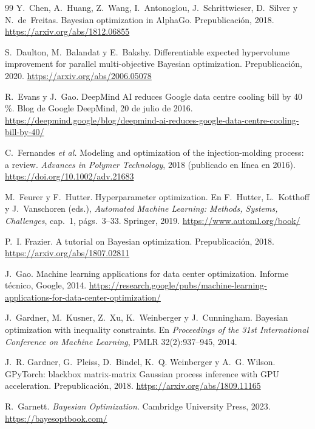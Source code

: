 \begin{thebibliography}{99}
Y.~Chen, A.~Huang, Z.~Wang, I.~Antonoglou, J.~Schrittwieser, D.~Silver y N.~de~Freitas.
\newblock Bayesian optimization in AlphaGo.
\newblock Prepublicación, 2018.
\newblock \url{https://arxiv.org/abs/1812.06855}

S.~Daulton, M.~Balandat y E.~Bakshy.
\newblock Differentiable expected hypervolume improvement for parallel multi-objective Bayesian optimization.
\newblock Prepublicación, 2020.
\newblock \url{https://arxiv.org/abs/2006.05078}

R.~Evans y J.~Gao.
\newblock DeepMind AI reduces Google data centre cooling bill by 40\,\%.
\newblock Blog de Google DeepMind, 20 de julio de 2016.
\newblock \url{https://deepmind.google/blog/deepmind-ai-reduces-google-data-centre-cooling-bill-by-40/}

C.~Fernandes \emph{et al.}
\newblock Modeling and optimization of the injection-molding process: a review.
\newblock \emph{Advances in Polymer Technology}, 2018 (publicado en línea en 2016).
\newblock \url{https://doi.org/10.1002/adv.21683}

M.~Feurer y F.~Hutter.
\newblock Hyperparameter optimization.
\newblock En F.~Hutter, L.~Kotthoff y J.~Vanschoren (eds.), \emph{Automated Machine Learning: Methods, Systems, Challenges}, cap.~1, págs.~3--33. Springer, 2019.
\newblock \url{https://www.automl.org/book/}

P.~I. Frazier.
\newblock A tutorial on Bayesian optimization.
\newblock Prepublicación, 2018.
\newblock \url{https://arxiv.org/abs/1807.02811}

J.~Gao.
\newblock Machine learning applications for data center optimization.
\newblock Informe técnico, Google, 2014.
\newblock \url{https://research.google/pubs/machine-learning-applications-for-data-center-optimization/}

J.~Gardner, M.~Kusner, Z.~Xu, K.~Weinberger y J.~Cunningham.
\newblock Bayesian optimization with inequality constraints.
\newblock En \emph{Proceedings of the 31st International Conference on Machine Learning}, PMLR 32(2):937--945, 2014.

J.~R. Gardner, G.~Pleiss, D.~Bindel, K.~Q. Weinberger y A.~G. Wilson.
\newblock GPyTorch: blackbox matrix-matrix Gaussian process inference with GPU acceleration.
\newblock Prepublicación, 2018.
\newblock \url{https://arxiv.org/abs/1809.11165}

R.~Garnett.
\newblock \emph{Bayesian Optimization}.
\newblock Cambridge University Press, 2023.
\newblock \url{https://bayesoptbook.com/}


\end{thebibliography}

